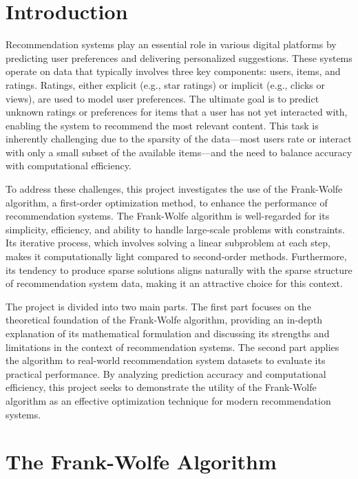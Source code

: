 \documentclass[a4paper, 11pt, reqno]{article} %
\begin{document}
\begin{multicols}{2} %


\section{Introduction}

Recommendation systems play an essential role in various digital platforms by predicting user preferences and delivering personalized suggestions. These systems operate on data that typically involves three key components: users, items, and ratings. Ratings, either explicit (e.g., star ratings) or implicit (e.g., clicks or views), are used to model user preferences. The ultimate goal is to predict unknown ratings or preferences for items that a user has not yet interacted with, enabling the system to recommend the most relevant content. This task is inherently challenging due to the sparsity of the data—most users rate or interact with only a small subset of the available items—and the need to balance accuracy with computational efficiency.

To address these challenges, this project investigates the use of the Frank-Wolfe algorithm, a first-order optimization method, to enhance the performance of recommendation systems. The Frank-Wolfe algorithm \cite{Frank1956AnAF} is well-regarded for its simplicity, efficiency, and ability to handle large-scale problems with constraints. Its iterative process, which involves solving a linear subproblem at each step, makes it computationally light compared to second-order methods. Furthermore, its tendency to produce sparse solutions aligns naturally with the sparse structure of recommendation system data, making it an attractive choice for this context.

The project is divided into two main parts. The first part focuses on the theoretical foundation of the Frank-Wolfe algorithm, providing an in-depth explanation of its mathematical formulation and discussing its strengths and limitations in the context of recommendation systems. The second part applies the algorithm to real-world recommendation system datasets to evaluate its practical performance. By analyzing prediction accuracy and computational efficiency, this project seeks to demonstrate the utility of the Frank-Wolfe algorithm as an effective optimization technique for modern recommendation systems.


\section{The Frank-Wolfe Algorithm}


\end{multicols}
\end{document}
